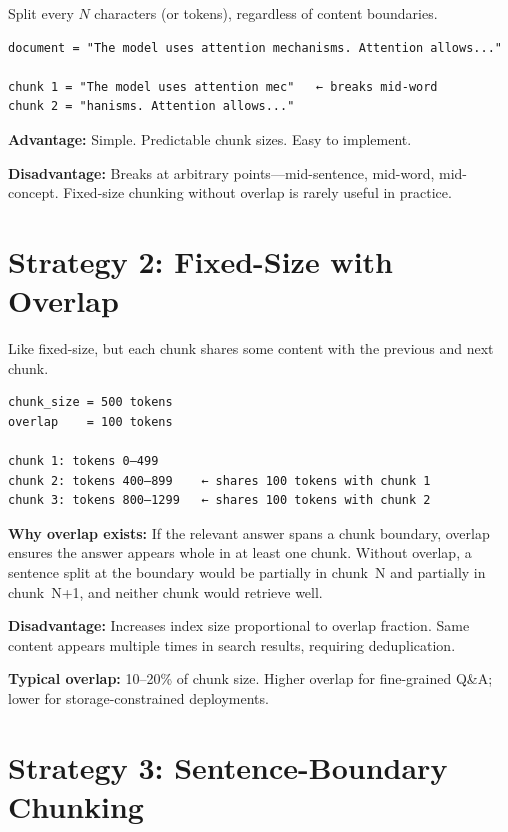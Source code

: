 Split every $N$ characters (or tokens), regardless of content boundaries.

\begin{Verbatim}
document = "The model uses attention mechanisms. Attention allows..."

chunk 1 = "The model uses attention mec"   ← breaks mid-word
chunk 2 = "hanisms. Attention allows..."
\end{Verbatim}

\textbf{Advantage:} Simple. Predictable chunk sizes. Easy to implement.

\textbf{Disadvantage:} Breaks at arbitrary points---mid-sentence, mid-word, mid-concept.
Fixed-size chunking without overlap is rarely useful in practice.

\section{Strategy 2: Fixed-Size with Overlap}

Like fixed-size, but each chunk shares some content with the previous and next chunk.

\begin{Verbatim}
chunk_size = 500 tokens
overlap    = 100 tokens

chunk 1: tokens 0–499
chunk 2: tokens 400–899    ← shares 100 tokens with chunk 1
chunk 3: tokens 800–1299   ← shares 100 tokens with chunk 2
\end{Verbatim}

\textbf{Why overlap exists:} If the relevant answer spans a chunk boundary, overlap ensures
the answer appears whole in at least one chunk. Without overlap, a sentence split at the
boundary would be partially in chunk~N and partially in chunk~N+1, and neither chunk would
retrieve well.

\textbf{Disadvantage:} Increases index size proportional to overlap fraction. Same content
appears multiple times in search results, requiring deduplication.

\textbf{Typical overlap:} 10--20\% of chunk size. Higher overlap for fine-grained Q\&A;
lower for storage-constrained deployments.

\section{Strategy 3: Sentence-Boundary Chunking}

